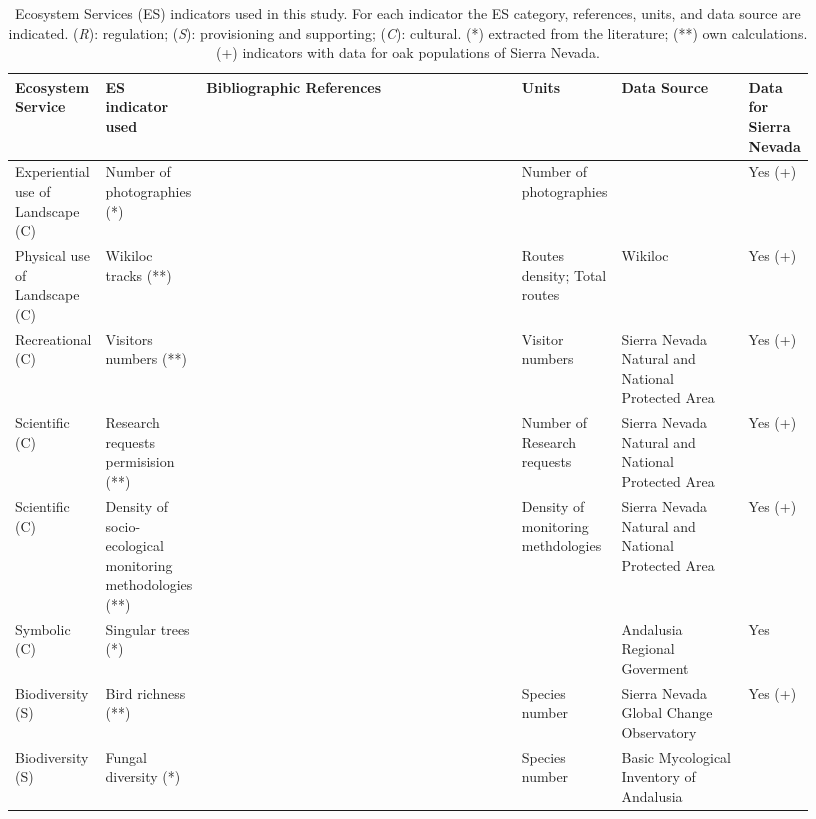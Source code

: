 \begin{table} 
\caption{Ecosystem Services (ES) indicators used in this study. For each indicator the ES category, references, units, and data source are indicated. (\emph{R}): regulation; (\emph{S}): provisioning and supporting; (\emph{C}): cultural. (*) extracted from the literature; (**) own calculations. (+) indicators with data for oak populations of Sierra Nevada.}\label{tab:es:data}
\centering
\scriptsize
\begin{adjustbox}{width=\linewidth}
\begin{threeparttable}
\begin{tabular}{>{\raggedleft}m{0.087\linewidth}>{\centering}m{0.108\linewidth}m{0.4\linewidth}>{\centering}m{0.102\linewidth}m{0.165\linewidth}m{0.071\linewidth}}
\textbf{Ecosystem Service} & \textbf{ES indicator used} & \textbf{Bibliographic References} & \textbf{Units} & \textbf{Data Source} & \textbf{Data for Sierra Nevada } \\ \toprule 
Experiential use of Landscape (C) & Number of photographies (*) & \autocite{MorenoLlorcaetal2020EvaluatingTourist} & Number of photographies & \autocite{RosCandeiraetal2020SocialMedia} & Yes (+) \\
Physical use of Landscape (C) & Wikiloc tracks (**) &  & Routes density; Total routes & Wikiloc & Yes (+) \\
Recreational (C) & Visitors numbers (**) &  & Visitor numbers & Sierra Nevada Natural and National Protected Area & Yes (+) \\
Scientific (C) & Research requests permisision (**) & \autocite{Zamoraetal2016GlobalChange} & Number of Research requests & Sierra Nevada Natural and National Protected Area & Yes (+) \\
Scientific (C) & Density of socio-ecological monitoring methodologies (**) & \autocite{Zamoraetal2016GlobalChange} & Density of monitoring methdologies & Sierra Nevada Natural and National Protected Area & Yes (+) \\
Symbolic (C) & Singular trees (*) & \autocites{IruritaFernandezetal2003ArbolesArboledas, SanchezGarciaetal2003ArbolesArboledas} &  & Andalusia Regional Goverment & Yes \\
Biodiversity (S) & Bird richness (**) & \autocites{BareaAzconetal2012PasseriformesOtras,PerezLuqueetal2016DatasetPasserine,ZamoraBareaAzcon2015LongTermChanges,PerezLuqueetal2021ManualGestion} & Species number & Sierra Nevada Global Change Observatory & Yes (+) \\
Biodiversity (S) & Fungal diversity (*) & \autocites{Ortegaetal2010MycorrhizalMacrofungi, MorenoArroyo2004InventarioMicologico} & Species number & Basic Mycological Inventory of Andalusia &  \\

\end{tabular}
\end{threeparttable}
\end{adjustbox}
\end{table}
